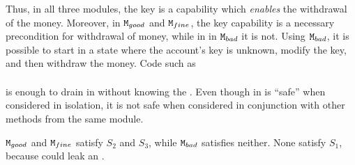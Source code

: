 \begin{example}
Thus, in all three modules, the key is a capability which \emph{enables} the withdrawal of the money. 
Moreover, in $\mbox{\normalfont{\texttt{M}}}_{{good}}$ and $\mbox{\normalfont{\texttt{M}}}_{{fine}}$, the key capability
is a necessary precondition for withdrawal of money, while in %
 in $\mbox{\normalfont{\texttt{M}}}_{{bad}}$ it is not. %
Using $\mbox{\normalfont{\texttt{M}}}_{{bad}}$, it is possible to start in a state where the account's key is unknown, modify the key, and then withdraw the money. 
Code   such as 
\\ 
$\ \strut \hspace{.2in} $  
\\ 
is enough to drain   in \ModB without knowing the \password.
Even though   in  \ModB is ``safe'' when considered in isolation, it is not safe when considered in conjunction with other methods from the same module. 

$\mbox{\normalfont{\texttt{M}}}_{{good}}$ and $\mbox{\normalfont{\texttt{M}}}_{{fine}}$ satisfy $S_2$ and $S_3$, while $\mbox{\normalfont{\texttt{M}}}_{{bad}}$ satisfies neither. 
None  satisfy $S_1$, because    could leak %
an .

\end{example}
 
